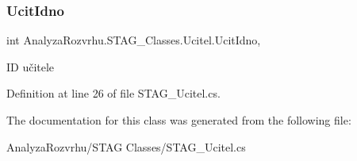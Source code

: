 \subsubsection{\texorpdfstring{Ucit\+Idno}{UcitIdno}}
{\footnotesize\ttfamily int Analyza\+Rozvrhu.\+S\+T\+A\+G\+\_\+\+Classes.\+Ucitel.\+Ucit\+Idno\hspace{0.3cm}{\ttfamily [get]}, {\ttfamily [set]}}



ID učitele 



Definition at line 26 of file S\+T\+A\+G\+\_\+\+Ucitel.\+cs.



The documentation for this class was generated from the following file\+:\begin{DoxyCompactItemize}
\item 
Analyza\+Rozvrhu/\+S\+T\+A\+G Classes/S\+T\+A\+G\+\_\+\+Ucitel.\+cs\end{DoxyCompactItemize}
